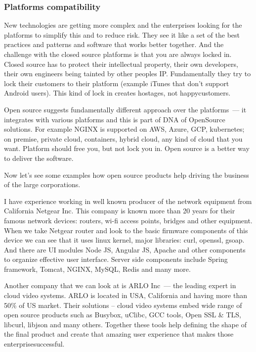 \documentclass[10pt, a5paper]{article}
\begin{document}
\subsubsection*{Platforms compatibility}

New technologies are getting more complex and the enterprises looking for the platforms to simplify this and to reduce risk. They see it like a set of the best practices and patterns and software that works better together. And the challenge with the closed source platforms is that you are always locked in. Closed source has to protect their intellectual property, their own developers, their own engineers being tainted by other peoples IP. Fundamentally they try to lock their customers to their platform (example iTunes that don’t support Android users). This kind of lock in creates hostages, not happy\linebreak customers.
 
Open source suggests fundamentally different approach over the platforms~--- it integrates with various platforms and this is part of DNA of OpenSource solutions. For example NGINX is supported on AWS, Azure, GCP, kubernetes; on premise, private cloud, containers, hybrid cloud, any kind of cloud that you want. Platform should free you, but not lock you in. 
Open source is a better way to deliver the software.

Now let’s see some examples how open source products help driving the business of the large corporations. 

I have experience working in well known producer of the network equipment from California Netgear Inc. This company is known more than 20 years for their famous network devices: routers, wi-fi access points, bridges and other equipment. When we take Netgear router and look to the basic firmware components of this device we can see that it uses linux kernel, major libraries: curl, openssl, gsoap. And there are UI modules Node JS, Angular JS, Apache and other components to organize effective user interface. Server side components include Spring framework, Tomcat, NGINX, MySQL, Redis and many more.

Another company that we can look at is ARLO Inc~--- the leading expert in cloud video systems. ARLO is located in USA, California and having more than 50\% of US market. Their solutions – cloud video systems embed wide range of open source products such as Busybox, uClibc, GCC tools, Open SSL \& TLS, libcurl, libjson and many others. Together these tools help defining the shape of the final product and create that amazing user experience that makes those enterprise\linebreak successful.
\end{document}
